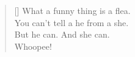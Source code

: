 \documentclass{article}
\begin{document}
\settowidth{\versewidth}{What a funny thing is a flea}
\begin{verse}[\versewidth]
What a funny thing is a flea. \\
You can’t tell a he from a she. \\
But he can. And she can. \\
Whoopee! \\
\end{verse}
\end{document}
